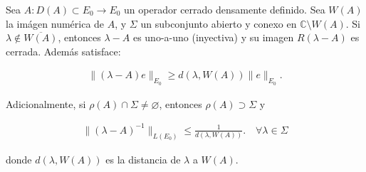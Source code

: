 \begin{Teorema}
    \label{ch:semigrupos:th:ImgNumerica}

    Sea $A : D(A) \subset E_0 \rightarrow E_0$ un operador cerrado densamente definido. Sea $W(A)$ la imágen numérica de $A$, y $\Sigma$ un subconjunto abierto y conexo en $\mathbb{C} \setminus W(A)$. Si $\lambda \not \in \overline{W(A)}$, entonces $\lambda - A$ es uno-a-uno (inyectiva) y su imagen $R(\lambda - A)$ es cerrada. Además satisface:

    \begin{align}
        \label{ch:semigrupos:th:ImgNumerica:desIg1}
        \lVert (\lambda - A)e \rVert_{E_0} \geq d(\lambda, W(A)) \lVert e \rVert_{E_0}.
    \end{align}

    Adicionalmente, si $\rho(A) \cap \Sigma \neq \varnothing$, entonces $\rho(A) \supset \Sigma$ y

    \begin{align}
        \label{ch:semigrupos:th:ImgNumerica:desIg2}
        \lVert (\lambda - A)^{-1}\rVert_{L(E_0)} \leq \frac{1}{d(\lambda, W(A))}. \quad \forall \lambda \in \Sigma
    \end{align}

    donde $d(\lambda, W(A))$ es la distancia de $\lambda$ a $W(A)$.
\end{Teorema}

